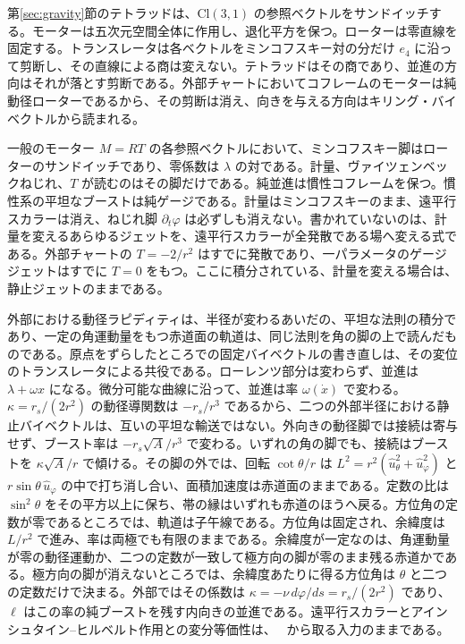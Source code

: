 \documentclass[a4paper]{article}
\begin{document}
第\ref{sec:gravity}節のテトラッドは、\(\mathrm{Cl}(3,1)\) の参照ベクトルをサンドイッチする。モーターは五次元空間全体に作用し、退化平方を保つ。ローターは零直線を固定する。トランスレータは各ベクトルをミンコフスキー対の分だけ \(e_{4}\) に沿って剪断し、その直線による商は変えない。テトラッドはその商であり、並進の方向はそれが落とす剪断である。外部チャートにおいてコフレームのモーターは純動径ローターであるから、その剪断は消え、向きを与える方向はキリング・バイベクトルから読まれる。

一般のモーター \(M=RT\) の各参照ベクトルにおいて、ミンコフスキー脚はローターのサンドイッチであり、零係数は \(\lambda\) の対である。計量、ヴァイツェンベックねじれ、\(T\) が読むのはその脚だけである。純並進は慣性コフレームを保つ。慣性系の平坦なブーストは純ゲージである。計量はミンコフスキーのまま、遠平行スカラーは消え、ねじれ脚 \(\partial_{t}\varphi\) は必ずしも消えない。書かれていないのは、計量を変えるあらゆるジェットを、遠平行スカラーが全発散である場へ変える式である。外部チャートの \(T=-2/r^{2}\) はすでに発散であり、一パラメータのゲージジェットはすでに \(T=0\) をもつ。ここに積分されている、計量を変える場合は、静止ジェットのままである。

外部における動径ラピディティは、半径が変わるあいだの、平坦な法則の積分であり、一定の角運動量をもつ赤道面の軌道は、同じ法則を角の脚の上で読んだものである。原点をずらしたところでの固定バイベクトルの書き直しは、その変位のトランスレータによる共役である。ローレンツ部分は変わらず、並進は \(\lambda+\omega x\) になる。微分可能な曲線に沿って、並進は率 \(\omega(\dot{x})\) で変わる。\(\kappa=r_{s}/(2r^{2})\) の動径導関数は \(-r_{s}/r^{3}\) であるから、二つの外部半径における静止バイベクトルは、互いの平坦な輸送ではない。外向きの動径脚では接続は寄与せず、ブースト率は \(-r_{s}\sqrt{A}/r^{3}\) で変わる。いずれの角の脚でも、接続はブーストを \(\kappa\sqrt{A}/r\) で傾ける。その脚の外では、回転 \(\cot\theta/r\) は \(L^{2}=r^{2}(\hat{u}_{\theta}^{2}+\hat{u}_{\varphi}^{2})\) と \(r\sin\theta\,\hat{u}_{\varphi}\) の中で打ち消し合い、面積加速度は赤道面のままである。定数の比は \(\sin^{2}\theta\) をその平方以上に保ち、帯の縁はいずれも赤道のほうへ戻る。方位角の定数が零であるところでは、軌道は子午線である。方位角は固定され、余緯度は \(L/r^{2}\) で進み、率は両極でも有限のままである。余緯度が一定なのは、角運動量が零の動径運動か、二つの定数が一致して極方向の脚が零のまま残る赤道かである。極方向の脚が消えないところでは、余緯度あたりに得る方位角は \(\theta\) と二つの定数だけで決まる。外部ではその係数は \(\kappa=-\nu\,d\varphi/ds=r_{s}/(2r^{2})\) であり、\(\ell\) はこの率の純ブーストを残す内向きの並進である。遠平行スカラーとアインシュタイン--ヒルベルト作用との変分等価性は、~\cite{maluf2013} から取る入力のままである。
\end{document}
